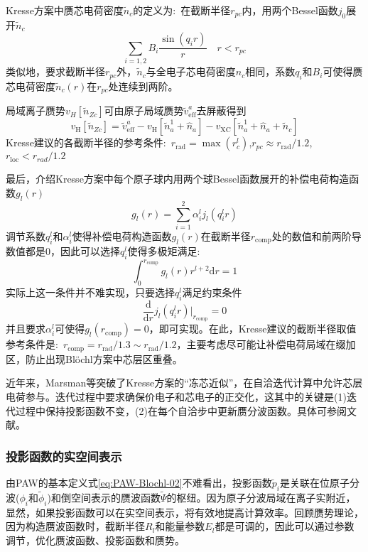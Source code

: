\textrm{Kresse}方案中赝芯电荷密度$\tilde n_c$的定义为:~在截断半径$r_{pc}$内，用两个\textrm{Bessel}函数$j_0$展开$\tilde n_c$
$$\sum_{i=1,2}B_i\dfrac{\sin(q_ir)}r\quad r<r_{pc}$$
类似地，要求截断半径$r_{pc}$外，$\tilde n_c$与全电子芯电荷密度$n_c$相同，系数$q_i$和$B_i$可使得赝芯电荷密度$\tilde n_c(r)$在$r_{pc}$处连续到两阶。

局域离子赝势$v_H[\tilde n_{Zc}]$可由原子局域赝势$\tilde v_{\mathrm{eff}}^a$去屏蔽得到
$$v_{\mathrm H}[\tilde n_{Zc}]=\tilde v_{\mathrm{eff}}^a-v_{\mathrm H}[\tilde n_a^1+\hat n_a]-v_{\mathrm{XC}}[\tilde n_a^1+\hat n_a+\tilde n_c]$$
\textrm{Kresse}建议的各截断半径的参考条件:~$r_{\mathrm{rad}}=\max({r_c^l})$,$r_{pc}\approx r_{\mathrm{rad}}/1.2$,$r_{\mathrm{loc}}<r_{rad}/1.2$

最后，介绍\textrm{Kresse}方案中每个原子球内用两个球\textrm{Bessel}函数展开的补偿电荷构造函数$g_l(r)$
$$g_l(r)=\sum_{i=1}^2\alpha_i^lj_l(q_i^lr)$$
调节系数$q_i^l$和$\alpha_i^l$使得补偿电荷构造函数$g_l(r)$在截断半径$r_{\mathrm{comp}}$处的数值和前两阶导数值都是0，因此可以选择$q_i^l$使得多极矩满足:~
$$\int_0^{r_{\mathrm{comp}}}g_l(r)r^{l+2}\mathrm{d}r=1$$
实际上这一条件并不难实现，只要选择$q_i^l$满足约束条件
$$\dfrac{\mathrm{d}}{\mathrm{d}r}j_l(q_i^lr)\bigg|_{r_{\mathrm{comp}}}=0$$
并且要求$\alpha_i^l$可使得$g_l(r_{\mathrm{comp}})=0$，即可实现。在此，\textrm{Kresse}建议的截断半径取值参考条件是:~$r_{\mathrm{comp}}=r_{\mathrm{rad}}/1.3\sim r_{\mathrm{rad}}/1.2$，主要考虑尽可能让补偿电荷局域在缀加区，防止出现\textrm{Bl\"ochl}方案中芯层区重叠。

近年来，\textrm{Marsman}等突破了\textrm{Kresse}方案的“冻芯近似”，在自洽迭代计算中允许芯层电荷参与。迭代过程中要求确保价电子和芯电子的正交化，这其中的关键是(1)迭代过程中保持投影函数不变，(2)在每个自洽步中更新赝分波函数。具体可参阅文献\cite{JCP125-104101_2006}。

\subsubsection{投影函数的实空间表示}
由\textrm{PAW}的基本定义式\eqref{eq:PAW-Blochl-02}不难看出，投影函数$\tilde p_i$是关联在位原子分波($\phi_i$和$\tilde\phi_i$)和倒空间表示的赝波函数$\tilde\Psi$的枢纽。因为原子分波局域在离子实附近，显然，如果投影函数可以在实空间表示，将有效地提高计算效率。回顾赝势理论，因为构造赝波函数时，截断半径$R_l$和能量参数$E_l$都是可调的，因此可以通过参数调节，优化赝波函数、投影函数和赝势。


